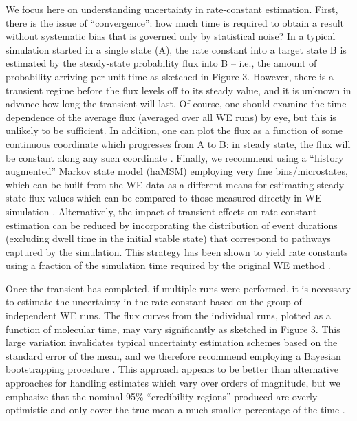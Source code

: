 \documentclass[9pt,tutorial,pubversion]{livecoms}
\begin{document}
We focus here on understanding uncertainty in rate-constant estimation. 
First, there is the issue of “convergence”: how much time is required to obtain a result without systematic bias that is governed only by statistical noise? 
In a typical simulation started in a single state (A), the rate constant into a target state B is estimated by the steady-state probability flux into B -- i.e., the amount of probability arriving per unit time as sketched in Figure 3. 
However, there is a transient regime before the flux levels off to its steady value, and it is unknown in advance how long the transient will last. 
Of course, one should examine the time-dependence of the average flux (averaged over all WE runs) by eye, but this is unlikely to be sufficient. 
In addition, one can plot the flux as a function of some continuous coordinate which progresses from A to B: in steady state, the flux will be constant along any such coordinate \citep{Jeremy2019}.
Finally, we recommend using a “history augmented” Markov state model (haMSM) employing very fine bins/microstates, which can be built from the WE data as a different means for estimating steady-state flux values which can be compared to those measured directly in WE simulation \citep{Jeremy2019}. 
Alternatively, the impact of transient effects on rate-constant estimation can be reduced by incorporating the distribution of event durations (excluding dwell time in the initial stable state) that correspond to pathways captured by the simulation. 
This strategy has been shown to yield rate constants using a fraction of the simulation time required by the original WE method \citep{DeGrave2019}. 

Once the transient has completed, if multiple runs were performed, it is necessary to estimate the uncertainty in the rate constant based on the group of independent WE runs. 
The flux curves from the individual runs, plotted as a function of molecular time, may vary significantly as sketched in Figure 3. 
This large variation invalidates typical uncertainty estimation schemes based on the standard error of the mean, and we therefore recommend employing a Bayesian bootstrapping procedure \citep{MostofianJCTC2019}. 
This approach appears to be better than alternative approaches for handling estimates which vary over orders of magnitude, but we emphasize that the nominal 95\% “credibility regions” produced are overly optimistic and only cover the true mean a much smaller percentage of the time \citep{MostofianJCTC2019}.
\end{document}
